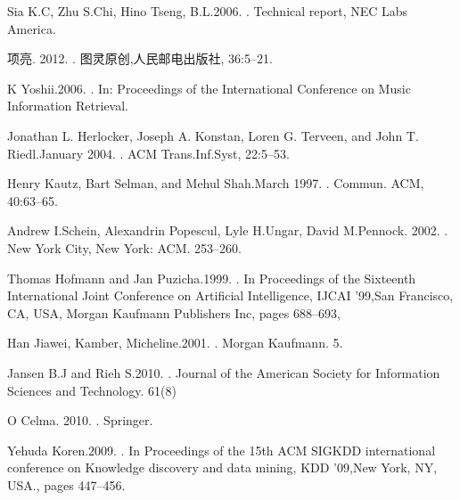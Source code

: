 \begin{thebibliography}{10}
Sia K.C, Zhu S.Chi, Hino Tseng, B.L.2006.
.
\newblock Technical report, NEC Labs America. 

项亮. 2012.
.
\newblock 图灵原创,人民邮电出版社, 36:5–21.

K Yoshii.2006.
.
\newblock In: Proceedings of the International Conference on Music Information Retrieval.

Jonathan L. Herlocker, Joseph A. Konstan, Loren G. Terveen, and John T. Riedl.January 2004.
.
\newblock ACM Trans.Inf.Syst, 22:5–53.

Henry Kautz, Bart Selman, and Mehul Shah.March 1997.
.
\newblock Commun. ACM, 40:63–65.

Andrew I.Schein, Alexandrin Popescul, Lyle H.Ungar, David M.Pennock. 2002.
.
\newblock New York City, New York: ACM. 253–260.

Thomas Hofmann and Jan Puzicha.1999. 
.
\newblock In Proceedings of the Sixteenth International Joint Conference on Artificial Intelligence, IJCAI ’99,San Francisco, CA, USA, Morgan Kaufmann Publishers Inc, pages 688–693, 

Han Jiawei, Kamber, Micheline.2001.
.
\newblock Morgan Kaufmann. 5.

Jansen B.J and Rieh S.2010.
.
\newblock Journal of the American Society for Information Sciences and Technology. 61(8)

O Celma. 2010.
.
\newblock Springer. 

Yehuda Koren.2009.
.
\newblock In Proceedings of the 15th ACM SIGKDD international conference on Knowledge discovery and data mining, KDD ’09,New York, NY, USA., pages 447–456.


\end{thebibliography}

